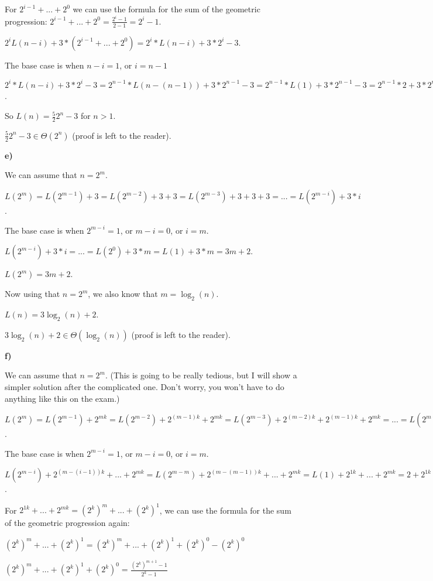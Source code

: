 For $2^{i-1}+...+2^0$ we can use the formula for the sum of the geometric progression: $2^{i-1}+...+2^0 = \frac{2^i-1}{2-1} = 2^i-1$.

$2^iL(n-i)+3*(2^{i-1}+...+2^0) = 2^i*L(n-i)+3*2^i-3$.

The base case is when $n-i=1$, or $i=n-1$

$2^i*L(n-i)+3*2^i-3 = 2^{n-1}*L(n-(n-1))+3*2^{n-1}-3 = 2^{n-1}*L(1)+3*2^{n-1}-3 = 2^{n-1}*2+3*2^{n-1}-3 = 5*2^{n-1}-3 = \frac{5}{2}2^n-3$.

So $L(n) = \frac{5}{2}2^n-3$ for $n>1$.

$\frac{5}{2}2^n-3 \in{} \Theta(2^n)$ (proof is left to the reader).

\textbf{e)}

We can assume that $n=2^m$.

$L(2^m) = L(2^{m-1}) + 3 =  L(2^{m-2}) + 3 + 3 = L(2^{m-3}) + 3 + 3 + 3 = ... = L(2^{m-i}) + 3*i$.

The base case is when $2^{m-i}=1$, or $m-i=0$, or $i=m$.

$L(2^{m-i}) + 3*i = ... = L(2^{0}) + 3*m = L(1) + 3*m = 3m + 2$.

$L(2^m) = 3m + 2$.

Now using that $n=2^m$, we also know that $m=\log_2(n)$.

$L(n) = 3\log_2(n) + 2$.

$3\log_2(n) + 2 \in{} \Theta(\log_2(n))$ (proof is left to the reader).

\textbf{f)}

We can assume that $n=2^m$. (This is going to be really tedious, but I will show a simpler solution after the complicated one. Don't worry, you won't have to do anything like this on the exam.)

$L(2^m) = L(2^{m-1}) + 2^{mk} = L(2^{m-2}) + 2^{(m-1)k} + 2^{mk} = L(2^{m-3}) + 2^{(m-2)k} + 2^{(m-1)k} + 2^{mk} = ... =  L(2^{m-i}) + 2^{(m-(i-1))k} + ... + 2^{mk}$.

The base case is when $2^{m-i}=1$, or $m-i=0$, or $i=m$.

$L(2^{m-i}) + 2^{(m-(i-1))k} + ... + 2^{mk} = L(2^{m-m}) + 2^{(m-(m-1))k} + ... + 2^{mk} = L(1) + 2^{1k} + ... + 2^{mk} = 2 + 2^{1k} + ... + 2^{mk}$.

For $2^{1k} + ... + 2^{mk} = (2^k)^m+...+(2^k)^1$, we can use the formula for the sum of the geometric progression again: 

$(2^k)^m+...+(2^k)^1 = (2^k)^m+...+(2^k)^1+(2^k)^0-(2^k)^0$

$(2^k)^m+...+(2^k)^1+(2^k)^0 = \frac{(2^k)^{m+1}-1}{2^k-1}$

